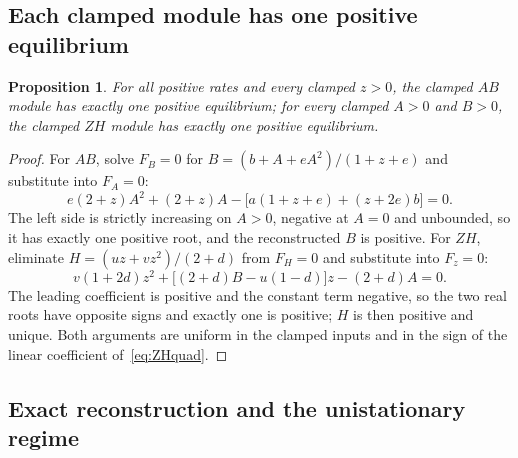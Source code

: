 \documentclass[11pt,a4paper]{article}
\theoremstyle{plain}
\newtheorem{proposition}[theorem]{Proposition}
\theoremstyle{definition}
\theoremstyle{remark}
\begin{document}
\subsection{Each clamped module has one positive equilibrium}

\begin{proposition}\label{prop:clamped}
For all positive rates and every clamped $z>0$, the clamped $AB$ module has exactly one positive equilibrium; for every clamped $A>0$ and $B>0$, the clamped $ZH$ module has exactly one positive equilibrium.
\end{proposition}
\begin{proof}
For $AB$, solve $F_B=0$ for $B=(b+A+eA^2)/(1+z+e)$ and substitute into $F_A=0$:
\begin{equation}\label{eq:ABquad}
e(2+z)A^2+(2+z)A-\bigl[a(1+z+e)+(z+2e)b\bigr]=0 .
\end{equation}
The left side is strictly increasing on $A>0$, negative at $A=0$ and unbounded, so it has exactly one positive root, and the reconstructed $B$ is positive. For $ZH$, eliminate $H=(uz+vz^2)/(2+d)$ from $F_H=0$ and substitute into $F_z=0$:
\begin{equation}\label{eq:ZHquad}
v(1+2d)z^2+\bigl[(2+d)B-u(1-d)\bigr]z-(2+d)A=0 .
\end{equation}
The leading coefficient is positive and the constant term negative, so the two real roots have opposite signs and exactly one is positive; $H$ is then positive and unique. Both arguments are uniform in the clamped inputs and in the sign of the linear coefficient of~\eqref{eq:ZHquad}.
\end{proof}

\subsection{Exact reconstruction and the unistationary regime}\label{sec:reconstruction}
\end{document}

